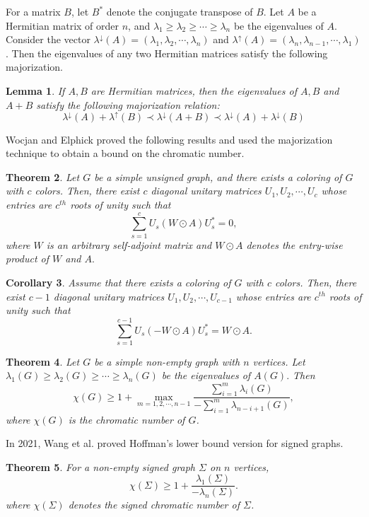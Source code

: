 \documentclass[12pt]{article}
\theoremstyle{plain}
\newtheorem{theorem}{Theorem}[section]
\newtheorem{lemma}[theorem]{Lemma}
\newtheorem{corollary}[theorem]{Corollary}
\numberwithin{equation}{section}
\begin{document}
	
	For a matrix \(B\), let \(B^{*}\) denote the conjugate transpose of $B$. Let $A$ be a Hermitian matrix of order $n$, and  $\lambda_{1}\geq \lambda_{2}\geq \cdots\geq \lambda_{n}$ be  the eigenvalues of $A$. Consider the vector $\lambda^{\downarrow}(A)=(\lambda_{1}, \lambda_{2}, \cdots, \lambda_{n})$ and $\lambda^{\uparrow}(A)=(\lambda_{n}, \lambda_{n-1}, \cdots, \lambda_{1})$. Then the eigenvalues of any two Hermitian matrices satisfy the following majorization.
	\begin{lemma}\emph{\cite{bhatia2013matrix}}\label{majorization_+}
		If $A,B$ are Hermitian matrices, then the eigenvalues of $A, B$ and $A + B$ satisfy the following majorization relation:
		\[\lambda^{\downarrow}(A)+\lambda^{\uparrow}(B)\prec \lambda^{\downarrow}(A+B)\prec \lambda^{\downarrow}(A)+\lambda^{\downarrow}(B) \]
	\end{lemma}
	Wocjan and Elphick \cite{wocjan2013new} proved the following results and used the majorization technique to obtain a bound on the chromatic number.
	\begin{theorem}\emph{\cite{wocjan2013new}}\label{diag_unitary} Let $G$ be a simple unsigned graph, and there exists a coloring of $G$ with $c$ colors. Then, there exist $c$ diagonal unitary matrices $U_{1}, U_{2},\cdots, U_{c} $ whose entries are $c^{th}$ roots of unity such that \[\sum_{s=1}^{c}U_{s}(W\odot A)U_{s}^{*}=0,\]
		where $W$ is an arbitrary self-adjoint matrix and $W\odot A$ denotes the entry-wise product of $W$ and $A.$
	\end{theorem}
	\begin{corollary}\emph{\cite{wocjan2013new}}\label{unitary_corollary}
		Assume that there exists a coloring of $G$ with $c$ colors. Then, there exist $c-1$ diagonal unitary matrices $U_{1}, U_{2},\cdots, U_{c-1} $ whose entries are $c^{th}$ roots of unity such that \[\sum_{s=1}^{c-1}U_{s}(-W\odot A)U_{s}^{*}=W\odot A.\]
	\end{corollary}
	\begin{theorem}\emph{\cite{wocjan2013new}}\label{encompassing}
		Let $G$ be a simple non-empty graph with $n$ vertices. Let $\lambda_{1}(G)\geq\lambda_{2}(G)\geq \cdots \geq \lambda_{n}(G) $ be the eigenvalues of $A(G).$ Then
		\[\chi(G)\geq 1+  \max_{m=1, 2, \cdots, n-1} \frac{\sum_{i=1}^{m}\lambda_{i}(G)}{-\sum_{i=1}^{m}\lambda_{n-i+1}(G)}, \] where $\chi(G)$ is the chromatic number of $G$.
	\end{theorem}
	
	In 2021, Wang et al. \cite{wang2021eigenvalues} proved Hoffman's lower bound version for signed graphs. 
	\begin{theorem}\emph{\cite{wang2021eigenvalues}}\label{Hoffman_signed}
		For a non-empty signed graph $\Sigma$ on $n$ vertices, $$\chi(\Sigma)\geq 1+ \dfrac{\lambda_1(\Sigma)}{-\lambda_n(\Sigma)}.$$
		where $\chi(\Sigma)$ denotes the signed chromatic number of $\Sigma$.
	\end{theorem}
	
\end{document}
